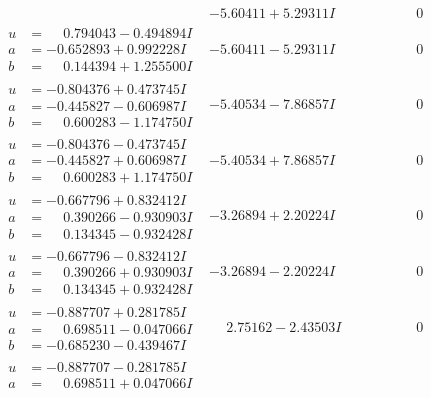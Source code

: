 \documentclass[1p]{elsarticle_modified}
\theoremstyle{definition}
\begin{document}
$$\begin{array}{c|c|c}
 & -5.60411 + 5.29311 I & \phantom{-0.000000 } 0 \\ \hline\begin{aligned}
u &= \phantom{-}0.794043 - 0.494894 I \\
a &= -0.652893 + 0.992228 I \\
b &= \phantom{-}0.144394 + 1.255500 I\end{aligned}
 & -5.60411 - 5.29311 I & \phantom{-0.000000 } 0 \\ \hline\begin{aligned}
u &= -0.804376 + 0.473745 I \\
a &= -0.445827 - 0.606987 I \\
b &= \phantom{-}0.600283 - 1.174750 I\end{aligned}
 & -5.40534 - 7.86857 I & \phantom{-0.000000 } 0 \\ \hline\begin{aligned}
u &= -0.804376 - 0.473745 I \\
a &= -0.445827 + 0.606987 I \\
b &= \phantom{-}0.600283 + 1.174750 I\end{aligned}
 & -5.40534 + 7.86857 I & \phantom{-0.000000 } 0 \\ \hline\begin{aligned}
u &= -0.667796 + 0.832412 I \\
a &= \phantom{-}0.390266 - 0.930903 I \\
b &= \phantom{-}0.134345 - 0.932428 I\end{aligned}
 & -3.26894 + 2.20224 I & \phantom{-0.000000 } 0 \\ \hline\begin{aligned}
u &= -0.667796 - 0.832412 I \\
a &= \phantom{-}0.390266 + 0.930903 I \\
b &= \phantom{-}0.134345 + 0.932428 I\end{aligned}
 & -3.26894 - 2.20224 I & \phantom{-0.000000 } 0 \\ \hline\begin{aligned}
u &= -0.887707 + 0.281785 I \\
a &= \phantom{-}0.698511 - 0.047066 I \\
b &= -0.685230 - 0.439467 I\end{aligned}
 & \phantom{-}2.75162 - 2.43503 I & \phantom{-0.000000 } 0 \\ \hline\begin{aligned}
u &= -0.887707 - 0.281785 I \\
a &= \phantom{-}0.698511 + 0.047066 I \\

\end{aligned}
\end{array}$$
\end{document}
